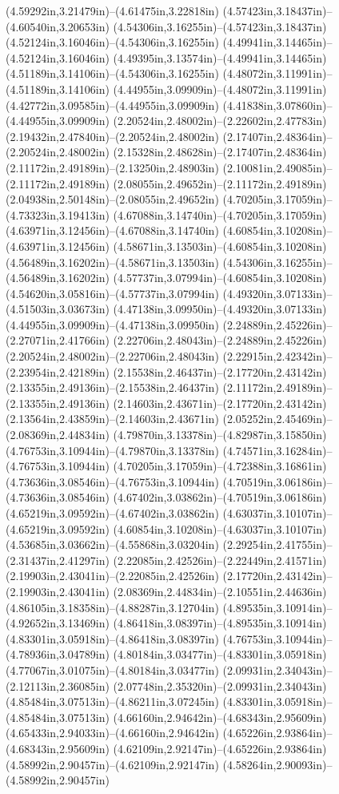 (4.59292in,3.21479in)--(4.61475in,3.22818in) (4.57423in,3.18437in)--(4.60540in,3.20653in) (4.54306in,3.16255in)--(4.57423in,3.18437in) (4.52124in,3.16046in)--(4.54306in,3.16255in) (4.49941in,3.14465in)--(4.52124in,3.16046in) (4.49395in,3.13574in)--(4.49941in,3.14465in) (4.51189in,3.14106in)--(4.54306in,3.16255in) (4.48072in,3.11991in)--(4.51189in,3.14106in) (4.44955in,3.09909in)--(4.48072in,3.11991in) (4.42772in,3.09585in)--(4.44955in,3.09909in) (4.41838in,3.07860in)--(4.44955in,3.09909in) (2.20524in,2.48002in)--(2.22602in,2.47783in) (2.19432in,2.47840in)--(2.20524in,2.48002in) (2.17407in,2.48364in)--(2.20524in,2.48002in) (2.15328in,2.48628in)--(2.17407in,2.48364in) (2.11172in,2.49189in)--(2.13250in,2.48903in) (2.10081in,2.49085in)--(2.11172in,2.49189in) (2.08055in,2.49652in)--(2.11172in,2.49189in) (2.04938in,2.50148in)--(2.08055in,2.49652in) (4.70205in,3.17059in)--(4.73323in,3.19413in) (4.67088in,3.14740in)--(4.70205in,3.17059in) (4.63971in,3.12456in)--(4.67088in,3.14740in) (4.60854in,3.10208in)--(4.63971in,3.12456in) (4.58671in,3.13503in)--(4.60854in,3.10208in) (4.56489in,3.16202in)--(4.58671in,3.13503in) (4.54306in,3.16255in)--(4.56489in,3.16202in) (4.57737in,3.07994in)--(4.60854in,3.10208in) (4.54620in,3.05816in)--(4.57737in,3.07994in) (4.49320in,3.07133in)--(4.51503in,3.03673in) (4.47138in,3.09950in)--(4.49320in,3.07133in) (4.44955in,3.09909in)--(4.47138in,3.09950in) (2.24889in,2.45226in)--(2.27071in,2.41766in) (2.22706in,2.48043in)--(2.24889in,2.45226in) (2.20524in,2.48002in)--(2.22706in,2.48043in) (2.22915in,2.42342in)--(2.23954in,2.42189in) (2.15538in,2.46437in)--(2.17720in,2.43142in) (2.13355in,2.49136in)--(2.15538in,2.46437in) (2.11172in,2.49189in)--(2.13355in,2.49136in) (2.14603in,2.43671in)--(2.17720in,2.43142in) (2.13564in,2.43859in)--(2.14603in,2.43671in) (2.05252in,2.45469in)--(2.08369in,2.44834in) (4.79870in,3.13378in)--(4.82987in,3.15850in) (4.76753in,3.10944in)--(4.79870in,3.13378in) (4.74571in,3.16284in)--(4.76753in,3.10944in) (4.70205in,3.17059in)--(4.72388in,3.16861in) (4.73636in,3.08546in)--(4.76753in,3.10944in) (4.70519in,3.06186in)--(4.73636in,3.08546in) (4.67402in,3.03862in)--(4.70519in,3.06186in) (4.65219in,3.09592in)--(4.67402in,3.03862in) (4.63037in,3.10107in)--(4.65219in,3.09592in) (4.60854in,3.10208in)--(4.63037in,3.10107in) (4.53685in,3.03662in)--(4.55868in,3.03204in) (2.29254in,2.41755in)--(2.31437in,2.41297in) (2.22085in,2.42526in)--(2.22449in,2.41571in) (2.19903in,2.43041in)--(2.22085in,2.42526in) (2.17720in,2.43142in)--(2.19903in,2.43041in) (2.08369in,2.44834in)--(2.10551in,2.44636in) (4.86105in,3.18358in)--(4.88287in,3.12704in) (4.89535in,3.10914in)--(4.92652in,3.13469in) (4.86418in,3.08397in)--(4.89535in,3.10914in) (4.83301in,3.05918in)--(4.86418in,3.08397in) (4.76753in,3.10944in)--(4.78936in,3.04789in) (4.80184in,3.03477in)--(4.83301in,3.05918in) (4.77067in,3.01075in)--(4.80184in,3.03477in) (2.09931in,2.34043in)--(2.12113in,2.36085in) (2.07748in,2.35320in)--(2.09931in,2.34043in) (4.85484in,3.07513in)--(4.86211in,3.07245in) (4.83301in,3.05918in)--(4.85484in,3.07513in) (4.66160in,2.94642in)--(4.68343in,2.95609in) (4.65433in,2.94033in)--(4.66160in,2.94642in) (4.65226in,2.93864in)--(4.68343in,2.95609in) (4.62109in,2.92147in)--(4.65226in,2.93864in) (4.58992in,2.90457in)--(4.62109in,2.92147in) (4.58264in,2.90093in)--(4.58992in,2.90457in) 